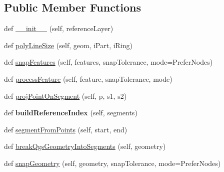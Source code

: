\subsection*{Public Member Functions}
\begin{DoxyCompactItemize}
\item 
def \mbox{\hyperlink{class_dsg_tools_1_1_dsg_geometry_snapper_1_1dsg_geometry_snapper_1_1_dsg_geometry_snapper_a327eda4b1787fc897dc6d55e9b6eaebd}{\+\_\+\+\_\+init\+\_\+\+\_\+}} (self, reference\+Layer)
\item 
def \mbox{\hyperlink{class_dsg_tools_1_1_dsg_geometry_snapper_1_1dsg_geometry_snapper_1_1_dsg_geometry_snapper_a7e424d4f1b7a44c442de0293124105f8}{poly\+Line\+Size}} (self, geom, i\+Part, i\+Ring)
\item 
def \mbox{\hyperlink{class_dsg_tools_1_1_dsg_geometry_snapper_1_1dsg_geometry_snapper_1_1_dsg_geometry_snapper_aaa4a4b66cca80225f32087717f300309}{snap\+Features}} (self, features, snap\+Tolerance, mode=Prefer\+Nodes)
\item 
def \mbox{\hyperlink{class_dsg_tools_1_1_dsg_geometry_snapper_1_1dsg_geometry_snapper_1_1_dsg_geometry_snapper_a454e82613c178a7bf1322353d49c50cb}{process\+Feature}} (self, feature, snap\+Tolerance, mode)
\item 
def \mbox{\hyperlink{class_dsg_tools_1_1_dsg_geometry_snapper_1_1dsg_geometry_snapper_1_1_dsg_geometry_snapper_ab2012cc6e7509f8f00a47bab2dc98b8c}{proj\+Point\+On\+Segment}} (self, p, s1, s2)
\item 
\mbox{\label{class_dsg_tools_1_1_dsg_geometry_snapper_1_1dsg_geometry_snapper_1_1_dsg_geometry_snapper_a6d3ad27bc271c8cd2c756bc9ea94a04d}} 
def {\bfseries build\+Reference\+Index} (self, segments)
\item 
def \mbox{\hyperlink{class_dsg_tools_1_1_dsg_geometry_snapper_1_1dsg_geometry_snapper_1_1_dsg_geometry_snapper_ad51384d8b24f5564aefc5800505cadaf}{segment\+From\+Points}} (self, start, end)
\item 
def \mbox{\hyperlink{class_dsg_tools_1_1_dsg_geometry_snapper_1_1dsg_geometry_snapper_1_1_dsg_geometry_snapper_a040223ee5660f632af73493c861275d8}{break\+Qgs\+Geometry\+Into\+Segments}} (self, geometry)
\item 
def \mbox{\hyperlink{class_dsg_tools_1_1_dsg_geometry_snapper_1_1dsg_geometry_snapper_1_1_dsg_geometry_snapper_afe06a8fafb4327a2bb278177c2ccdcf5}{snap\+Geometry}} (self, geometry, snap\+Tolerance, mode=Prefer\+Nodes)
\end{DoxyCompactItemize}
